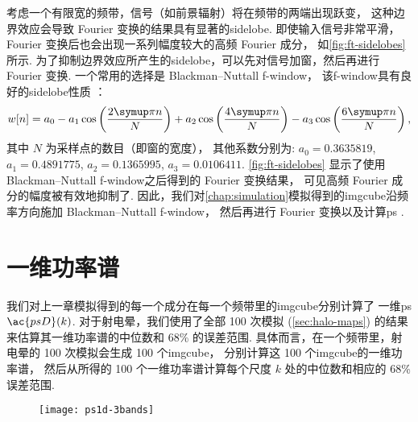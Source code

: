 考虑一个有限宽的频带，信号（如前景辐射）将在频带的两端出现跃变，
这种边界效应会导致 Fourier 变换的结果具有显著的\ac{sidelobe}.
即使输入信号非常平滑，Fourier 变换后也会出现一系列幅度较大的高频 Fourier 成分，
如\autoref{fig:ft-sidelobes} 所示.
为了抑制边界效应所产生的\ac{sidelobe}，可以先对信号加窗，然后再进行 Fourier 变换.
一个常用的选择是 Blackman--Nuttall \ac{f-window}，
该\ac{f-window}具有良好的\ac{sidelobe}性质 \cite{nuttall1981}：
\begin{equation}
  \label{eq:bn-window}
  w[n] = a_0 - a_1 \cos\left(\frac{2\Cpi n}{N}\right)
    + a_2 \cos\left(\frac{4\Cpi n}{N}\right)
    - a_3 \cos\left(\frac{6\Cpi n}{N}\right) ,
\end{equation}
其中
$N$ 为采样点的数目（即窗的宽度），
其他系数分别为:
$a_0 = \num{0.3635819}$,
$a_1 = \num{0.4891775}$,
$a_2 = \num{0.1365995}$,
$a_3 = \num{0.0106411}$.
\autoref{fig:ft-sidelobes} 显示了使用 Blackman--Nuttall 
\ac{f-window}之后得到的 Fourier 变换结果，
可见高频 Fourier 成分的幅度被有效地抑制了.
因此，我们对\autoref{chap:simulation}模拟得到的\ac{imgcube}沿频率方向施加
Blackman--Nuttall \ac{f-window}，
然后再进行 Fourier 变换以及计算\ac{ps} \cite{trott2015,chapman2016}.


\section{一维功率谱}
\label{sec:ps1d}

我们对上一章模拟得到的每一个成分在每一个频带里的\ac{imgcube}分别计算了
一维\ac{ps} $\ac{psD}(k)$.
对于射电晕，我们使用了全部 100 次模拟 (\autoref{sec:halo-maps}) 的结果
来估算其一维功率谱的中位数和 68\% 的误差范围.
具体而言，在一个频带里，射电晕的 100 次模拟会生成 100 个\ac{imgcube}，
分别计算这 100 个\ac{imgcube}的一维功率谱，
然后从所得的 100 个一维功率谱计算每个尺度 $k$ 处的中位数和相应的 68\% 误差范围.

\begin{figure}[htp]
  \centering
  \texttt{[image: ps1d-3bands]}
  \label{fig:ps1d-3bands}
\end{figure}

